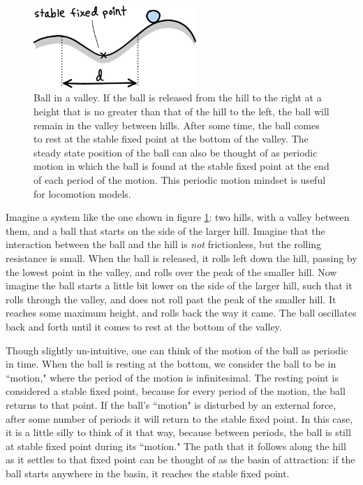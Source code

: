 \begin{figure}[h]		%
\begin{centering}
\includegraphics[width=0.55\textwidth]{Figures/BallOnHill}\par
\end{centering}
\caption[Diagram: Ball in a Valley]{Ball in a valley. If the ball is released
from the hill to the right at a height that is no greater than that of the hill
to the left, the ball will remain in the valley between hills. After some time,
the ball comes to rest at the stable fixed point at the bottom of the valley.
The steady state position of the ball can also be thought of as periodic motion
in which the ball is found at the stable fixed point at the end of each period
of the motion. This periodic motion mindset is useful for locomotion models.}
\label{fig:BallOnHill}
\end{figure}
%

Imagine a system like the one shown in figure \ref{fig:BallOnHill}: two hills,
with a valley between them, and a ball that starts on the side of the larger
hill. Imagine that the interaction between the ball and the hill is \emph{not}
frictionless, but the rolling resistance is small. When the ball is released,
it rolls left down the hill, passing by the lowest point in the valley,
and rolls over the peak of the smaller hill. Now imagine the ball starts a
little bit lower on the side of the larger hill, such that it rolls through the
valley, and does not roll past the peak of the smaller hill. It reaches some
maximum height, and rolls back the way it came. The ball oscillates back and
forth until it comes to rest at the bottom of the valley. 

Though slightly un-intuitive, one can think of the motion of the ball as
periodic in time. When the ball is resting at the bottom, we consider the ball
to be in ``motion," where the period of the motion is infinitesimal. The
resting point is considered a stable fixed point, because for every period of
the motion, the ball returns to that point. If the ball's ``motion" is
disturbed by an external force, after some number of periods it will return to
the stable fixed point. In this case, it is a little silly to think of it that
way, because between periods, the ball is still at stable fixed point during
its ``motion."  The path that it
follows along the hill as it settles to that fixed point can be thought of as
the basin of attraction: if the ball starts anywhere in the basin, it reaches
the stable fixed point. 

